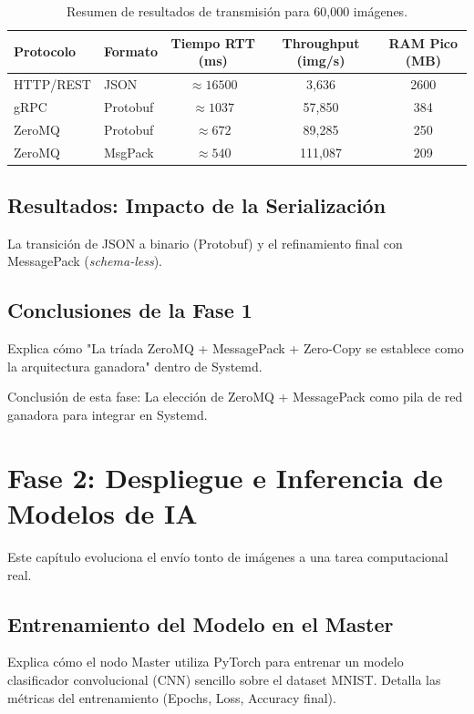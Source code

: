 \documentclass[11pt, a4paper]{report}
\begin{document}
\begin{table}[htbp]
    \centering
    \begin{tabular}{llccc}
        \toprule
        \textbf{Protocolo} & \textbf{Formato} & \textbf{Tiempo RTT (ms)} & \textbf{Throughput (img/s)} & \textbf{RAM Pico (MB)} \\
        \midrule
        HTTP/REST & JSON & $\approx 16500$ & 3,636 & 2600 \\
        gRPC & Protobuf & $\approx 1037$ & 57,850 & 384 \\
        ZeroMQ & Protobuf & $\approx 672$ & 89,285 & 250 \\
        ZeroMQ & MsgPack & $\approx 540$ & 111,087 & 209 \\
        \bottomrule
    \end{tabular}
    \caption{Resumen de resultados de transmisión para 60,000 imágenes.}
    \label{tab:resultados_red}
\end{table}

\section{Resultados: Impacto de la Serialización}
La transición de JSON a binario (Protobuf) y el refinamiento final con MessagePack (\textit{schema-less}).

\section{Conclusiones de la Fase 1}
Explica cómo "La tríada ZeroMQ + MessagePack + Zero-Copy se establece como la arquitectura ganadora" dentro de Systemd.

Conclusión de esta fase: La elección de ZeroMQ + MessagePack como pila de red ganadora para
integrar en Systemd.

\chapter{Fase 2: Despliegue e Inferencia de Modelos de IA}

Este capítulo evoluciona el envío tonto de imágenes a una tarea computacional real.

\section{Entrenamiento del Modelo en el Master}
Explica cómo el nodo Master utiliza PyTorch para entrenar un modelo clasificador convolucional (CNN) sencillo sobre el dataset MNIST. Detalla las métricas del entrenamiento (Epochs, Loss, Accuracy final).
\end{document}
